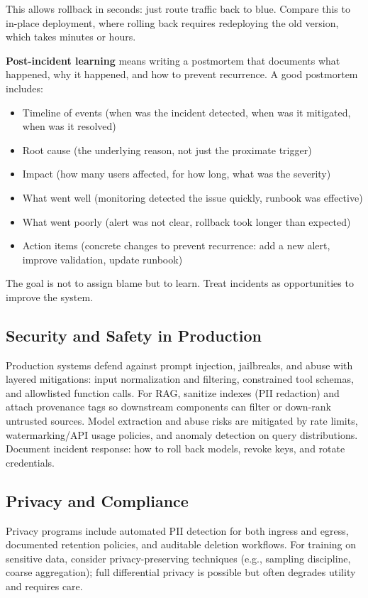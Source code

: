This allows rollback in seconds: just route traffic back to blue. Compare this to in-place deployment, where rolling back requires redeploying the old version, which takes minutes or hours.

\textbf{Post-incident learning} means writing a postmortem that documents what happened, why it happened, and how to prevent recurrence. A good postmortem includes:

\begin{itemize}
\item Timeline of events (when was the incident detected, when was it mitigated, when was it resolved)
\item Root cause (the underlying reason, not just the proximate trigger)
\item Impact (how many users affected, for how long, what was the severity)
\item What went well (monitoring detected the issue quickly, runbook was effective)
\item What went poorly (alert was not clear, rollback took longer than expected)
\item Action items (concrete changes to prevent recurrence: add a new alert, improve validation, update runbook)
\end{itemize}

The goal is not to assign blame but to learn. Treat incidents as opportunities to improve the system.

\subsection{Security and Safety in Production}
\vspace{0.3cm}
Production systems defend against prompt injection, jailbreaks, and abuse with layered mitigations: input normalization and filtering, constrained tool schemas, and allowlisted function calls. For RAG, sanitize indexes (PII redaction) and attach provenance tags so downstream components can filter or down-rank untrusted sources. Model extraction and abuse risks are mitigated by rate limits, watermarking/API usage policies, and anomaly detection on query distributions. Document incident response: how to roll back models, revoke keys, and rotate credentials.

\vspace{1em}
\subsection{Privacy and Compliance}
\vspace{0.3cm}
Privacy programs include automated PII detection for both ingress and egress, documented retention policies, and auditable deletion workflows. For training on sensitive data, consider privacy-preserving techniques (e.g., sampling discipline, coarse aggregation); full differential privacy is possible but often degrades utility and requires care.

